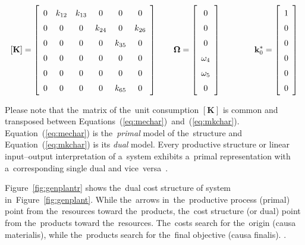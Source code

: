 \documentclass[energies,article,accept,moreauthors,pdftex]{Definitions/mdpi}
\newcommand{\vm}[1]{\ensuremath{\mathbf{#1}}}
\begin{document}
\begin{equation*}
    \def\arraystretch{1.5}
    \left[\vm{K}\right]=\left[\begin{array}{cccccc}
    0 & k_{12} & k_{13} & 0 & 0 & 0 \\
    0 & 0 & 0 & k_{24} & 0 & k_{26} \\
    0 & 0 & 0 & 0 & k_{35} & 0 \\
    0 & 0 & 0 & 0 & 0 & 0 \\
    0 & 0 & 0 & 0 & 0 & 0 \\
    0 & 0 & 0 & 0 & k_{65} & 0
    \end{array}
    \right]
    \qquad
    \vm{\Omega}=\left[\begin{array}{c}
    0 \\
    0 \\
    0 \\
    \omega_4 \\
    \omega_5 \\
    0
    \end{array}
    \right]
    \qquad
    \qquad
    \vm{k}_0^*=\left[\begin{array}{c}
    1 \\
    0 \\
    0 \\
    0 \\
    0 \\
    0
    \end{array}
    \right]
\end{equation*}

Please note that the~matrix of the~unit consumption $\left[\vm{K}\right]$ is common and transposed between Equations~(\ref{eq:mechar})~and~(\ref{eq:mkchar}). Equation~(\ref{eq:mechar}) is the~\emph{primal} model of the~structure and Equation~(\ref{eq:mkchar}) is its \emph{dual} model. Every productive structure or linear input–output interpretation of a~system exhibits a~primal representation with a~corresponding single dual and vice~versa~\cite{Boyd2004}.

Figure~\ref{fig:genplantr} shows the~dual cost structure of system in~Figure~\ref{fig:genplant}. While the~arrows in~the~productive process (primal) point from the~resources toward the~products, the~cost structure (or dual) point from the~products toward the~resources. The~costs search for the~origin (causa materialis), while the~products search for the~final objective (causa finalis). \cite{Valero1990d}.
\end{document}
